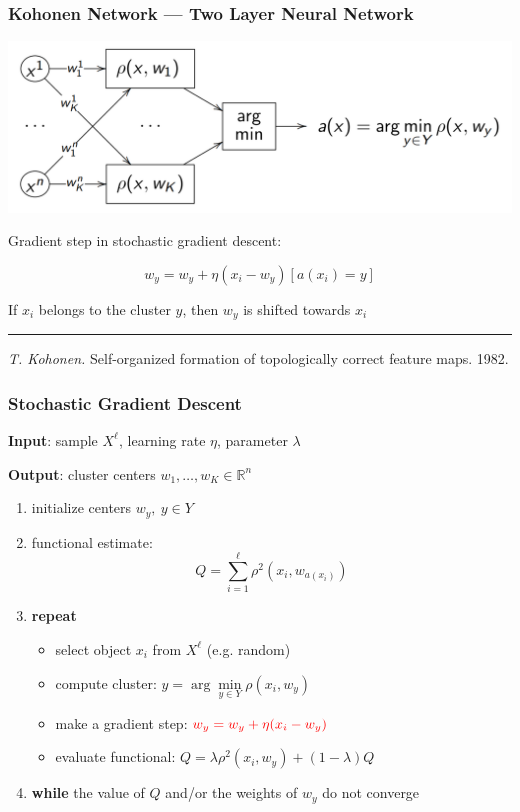 \documentclass[fullscreen=true, bookmarks=true, hyperref={pdfencoding=unicode}]{beamer}
\begin{document}
\begin{frame}
  \frametitle{Kohonen Network — Two Layer Neural Network}

   \begin{center}
     \includegraphics[keepaspectratio,
                      width=0.7\paperwidth]{kohonen-net.png}
   \end{center}

   \pause
   Gradient step in stochastic gradient descent:

   $$w_y = w_y + \eta(x_i-w_y)[a(x_i)=y]$$

   If $x_i$ belongs to the cluster $y$, then $w_y$ is shifted towards $x_i$

   \vspace{0.5cm}
   \noindent\rule{8cm}{0.4pt}

   {\footnotesize 
   {\it T. Kohonen.} Self-organized formation of topologically correct feature maps. 1982.}
\end{frame}




\begin{frame}
  \frametitle{Stochastic Gradient Descent}

   {\bf Input}: sample $X^\ell$, learning rate $\eta$, parameter $\lambda$

   {\bf Output}: cluster centers $w_1, \dots, w_K \in \mathbb{R}^n$

   \pause
   \begin{enumerate}
     \item initialize centers $w_y,\ y \in Y$
     \pause
     \item functional estimate: $${Q} = \sum\limits_{i=1}^\ell \rho^2(x_i, w_{a(x_i)}) $$
     \pause
     \item {\bf repeat}
       \begin{itemize}
         \item select object $x_i$ from $X^\ell$ (e.g. random)
         \item compute cluster: $y = \arg\min\limits_{y \in Y} \rho(x_i, w_y)$
         \item make a gradient step: $\color{red}{w_y = w_y + \eta (x_i - w_y)}$
         \item evaluate functional: ${Q} = \lambda \rho^2(x_i, w_y) + (1 - \lambda) {Q}$
       \end{itemize}
     \pause
     \item {\bf while} the value of ${Q}$ and/or the weights of $w_y$ do not converge
   \end{enumerate}
\end{frame}
\end{document}
